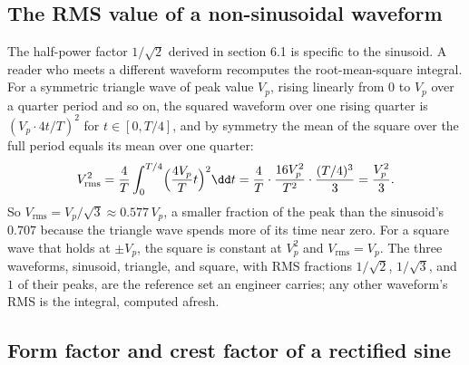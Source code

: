 \subsection{The RMS value of a non-sinusoidal waveform}

The half-power factor $1/\sqrt{2}$ derived in section 6.1 is
specific to the sinusoid. A reader who meets a different waveform
recomputes the root-mean-square integral. For a symmetric triangle
wave of peak value $V_{p}$, rising linearly from $0$ to $V_{p}$ over
a quarter period and so on, the squared waveform over one rising
quarter is $(V_{p}\cdot 4t/T)^{2}$ for $t \in [0, T/4]$, and by
symmetry the mean of the square over the full period equals its mean
over one quarter:
\[
V_{\mathrm{rms}}^{2} = \frac{4}{T}\int_{0}^{T/4}\Bigl(\frac{4
V_{p}}{T}t\Bigr)^{2}\dd t = \frac{4}{T}\cdot\frac{16 V_{p}^{2}}
{T^{2}}\cdot\frac{(T/4)^{3}}{3} = \frac{V_{p}^{2}}{3}.
\]
So $V_{\mathrm{rms}} = V_{p}/\sqrt{3} \approx 0.577\,V_{p}$, a
smaller fraction of the peak than the sinusoid's $0.707$ because the
triangle wave spends more of its time near zero. For a square wave
that holds at $\pm V_{p}$, the square is constant at $V_{p}^{2}$ and
$V_{\mathrm{rms}} = V_{p}$. The three waveforms, sinusoid, triangle,
and square, with RMS fractions $1/\sqrt{2}$, $1/\sqrt{3}$, and $1$
of their peaks, are the reference set an engineer carries; any other
waveform's RMS is the integral, computed afresh.

\subsection{Form factor and crest factor of a rectified sine}

